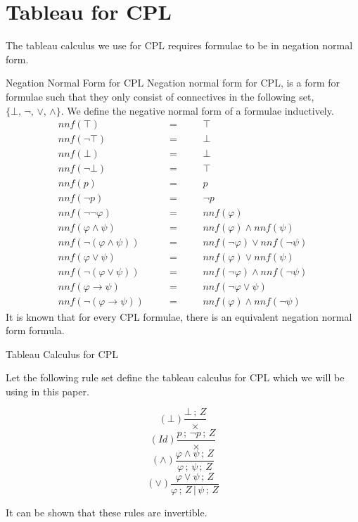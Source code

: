 \documentclass{llncs}
\newcommand{\nnf}{{nnf}}
\begin{document}
\section{Tableau for CPL}\label{Tableau for CPL}
%
The tableau calculus we use for CPL requires formulae to be in negation
normal form.
%
\begin{definition}{Negation Normal Form for CPL}\label{NNF for CPL}
Negation normal form for CPL, is a form for formulae such that they only
consist of connectives in the following set, $\{\bot, \, \neg, \, \vee,\,
\wedge\}$. We define the negative normal form of a formulae inductively.
%
$$
\begin{array}{rlcll}
\nnf(\top)&\quad&=&\quad&\top \\
\nnf(\neg\top)&&=&&\bot \\
\nnf(\bot)&\quad&=&\quad&\bot \\
\nnf(\neg\bot)&&=&&\top \\
\nnf(p)&&=&&p \\
\nnf(\neg p)&&=&&\neg p \\
\nnf(\neg\neg\varphi)&&=&&\nnf(\varphi) \\
\nnf(\varphi \wedge \psi)&&=&&\nnf(\varphi) \wedge \nnf(\psi) \\
\nnf(\neg(\varphi \wedge \psi))&&=&&\nnf(\neg\varphi) \vee \nnf(\neg\psi) \\
\nnf(\varphi \vee \psi)&&=&&\nnf(\varphi) \vee \nnf(\psi) \\
\nnf(\neg(\varphi \vee \psi))&&=&&\nnf(\neg\varphi) \wedge \nnf(\neg\psi) \\
\nnf(\varphi \rightarrow \psi)&&=&&\nnf(\neg\varphi \vee \psi) \\
\nnf(\neg(\varphi \rightarrow \psi))&&=&&\nnf(\varphi) \wedge \nnf(\neg\psi)
\end{array}
$$
%
It is known that for every CPL formulae, there is an equivalent negation normal
form formula.
\end{definition}
\begin{definition}{Tableau Calculus for CPL}\label{Tableau Calculus for CPL}

Let the following rule set define the tableau calculus for CPL which we will be
using in this paper.
%
\begin{multicols}{4}
\noindent
\begin{equation*}
(\bot)\frac{\bot\,;\,Z}{\times}
\end{equation*}
\begin{equation*}
(Id)\frac{p\,;\,\neg p\,;\,Z}{\times}
\end{equation*}
\begin{equation*}
(\wedge)\frac{\varphi \wedge \psi\,;\,Z}{\varphi\,;\,\psi\,;\,Z}
\end{equation*}
\begin{equation*}
(\vee)\frac{\varphi \vee \psi\,;\,Z}{\varphi\,;\,Z\,|\,\psi\,;\,Z}
\end{equation*}
\end{multicols}
%
It can be shown that these rules are invertible.
\end{definition}
%
\end{document}
